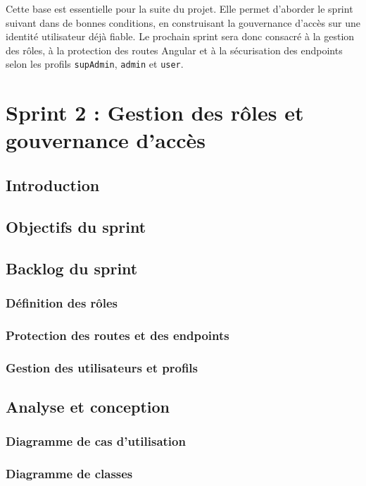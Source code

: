 \documentclass[12pt,a4paper]{report}
\begin{document}
Cette base est essentielle pour la suite du projet. Elle permet d'aborder le sprint suivant dans de bonnes conditions, en construisant la gouvernance d'accès sur une identité utilisateur déjà fiable. Le prochain sprint sera donc consacré à la gestion des rôles, à la protection des routes Angular et à la sécurisation des endpoints selon les profils \texttt{supAdmin}, \texttt{admin} et \texttt{user}.




\chapter{Sprint 2 : Gestion des rôles et gouvernance d'accès}

\section{Introduction}
\section{Objectifs du sprint}
\section{Backlog du sprint}
\subsection{Définition des rôles}
\subsection{Protection des routes et des endpoints}
\subsection{Gestion des utilisateurs et profils}
\section{Analyse et conception}
\subsection{Diagramme de cas d'utilisation}
\subsection{Diagramme de classes}
\end{document}
